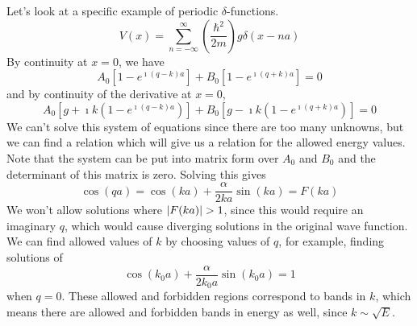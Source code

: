 \documentclass[a4paper,twoside,master.tex]{subfiles}
\begin{document}
\begin{ex}
    Let's look at a specific example of periodic $\delta$-functions.
    \begin{equation}
        V(x) = \sum_{n=-\infty}^{\infty} \left( \frac{\hbar^2}{2m} \right) g \delta(x-na)
    \end{equation}
    By continuity at $ x=0 $, we have
    \begin{equation}
        A_0\left[ 1 - e^{\imath (q-k)a} \right] + B_0 \left[ 1 - e^{\imath(q+k) a} \right] = 0
    \end{equation}
    and by continuity of the derivative at $ x=0 $,
    \begin{equation}
        A_0 \left[ g + \imath k \left( 1 - e^{\imath (q-k) a} \right) \right] + B_0 \left[ g - \imath k \left( 1 - e^{\imath (q+k) a} \right) \right] = 0
    \end{equation}
    We can't solve this system of equations since there are too many unknowns, but we can find a relation which will give us a relation for the allowed energy values. Note that the system can be put into matrix form over $ A_0 $ and $ B_0 $ and the determinant of this matrix is zero. Solving this gives
    \begin{equation}
        \cos(qa) = \cos(ka) + \frac{\alpha}{2ka} \sin(ka) = F(ka)
    \end{equation}
    We won't allow solutions where $ \abs{F(ka)} > 1 $, since this would require an imaginary $ q $, which would cause diverging solutions in the original wave function. We can find allowed values of $ k $ by choosing values of $ q $, for example, finding solutions of
    \begin{equation}
        \cos(k_0 a) + \frac{\alpha}{2 k_0 a} \sin(k_0 a) = 1
    \end{equation}
    when $ q=0 $. These allowed and forbidden regions correspond to bands in $ k $, which means there are allowed and forbidden bands in energy as well, since $ k \sim \sqrt{E} $.


\end{ex}
\end{document}

